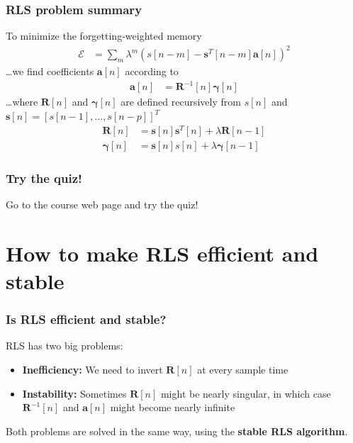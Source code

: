 \documentclass{beamer}
\begin{document}
\begin{frame}
  \frametitle{RLS problem summary}

  To minimize the forgetting-weighted memory
  \begin{align*}
    \mathcal{E} &= \sum_m\lambda^m\left(s[n-m]-\mathbf{s}^T[n-m]\mathbf{a}[n]\right)^2
  \end{align*}
  \ldots we find coefficients $\mathbf{a}[n]$ according to
  \begin{align*}
    \mathbf{a}[n] &= \mathbf{R}^{-1}[n]\boldsymbol{\gamma}[n]
  \end{align*}
  \ldots where $\mathbf{R}[n]$ and $\boldsymbol{\gamma}[n]$ are
  defined recursively from $s[n]$ and
  $\mathbf{s}[n]=[s[n-1],\ldots,s[n-p]]^T$
  \begin{align*}
    \mathbf{R}[n]&=\mathbf{s}[n]\mathbf{s}^T[n] + \lambda\mathbf{R}[n-1]\\
    \boldsymbol{\gamma}[n] &= \mathbf{s}[n]s[n] + \lambda\boldsymbol{\gamma}[n-1]
  \end{align*}
\end{frame}

\begin{frame}
  \frametitle{Try the quiz!}

  Go to the course web page and try the quiz!
\end{frame}

\section{How to make RLS efficient and stable}

\begin{frame}
  \frametitle{Is RLS efficient and stable?}

  RLS has two big problems:
  \begin{itemize}
  \item \textbf{Inefficiency:} We need to invert $\mathbf{R}[n]$ at
    every sample time
  \item \textbf{Instability:} Sometimes $\mathbf{R}[n]$ might be
    nearly singular, in which case $\mathbf{R}^{-1}[n]$ and
    $\mathbf{a}[n]$ might become nearly infinite
  \end{itemize}
  Both problems are solved in the same way, using the
  \textbf{stable RLS algorithm}.
\end{frame}
\end{document}
